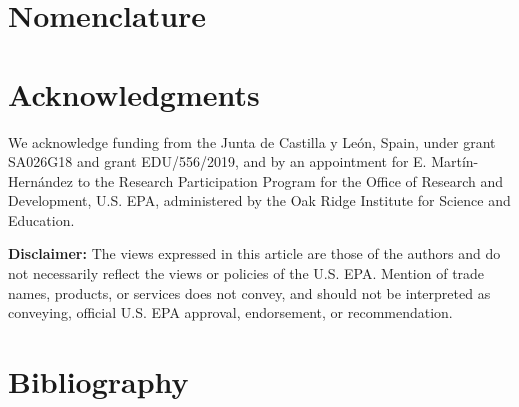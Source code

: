 \begin{refsection}[referencesCh3]

\section*{Nomenclature}

\vspace{-0.8cm}
\begingroup     
\let\clearpage\relax
%

%
\glsaddall
\setlength\LTleft{0pt}
\setlength\LTright{0pt}
\setlength\glsdescwidth{0.8\hsize}
\renewcommand*{\glossarypreamble}{\vspace{-0.8cm}}
\printglossary[type=VarCh3, style=long]
\vspace{10pt}
\printglossary[type=AcroCh3, style=long]
\endgroup


\section*{Acknowledgments} \label{section:Ch3Acknowledgments}
We acknowledge funding from the Junta de Castilla y Le\'{o}n, Spain, under grant SA026G18 and grant EDU/556/2019, and by an appointment for E. Mart\'{i}n-Hern\'{a}ndez to the Research Participation Program for the Office of Research and Development, U.S. EPA, administered by the Oak Ridge Institute for Science and Education. 

\textbf{Disclaimer:} The views expressed in this article are those of the authors and do not necessarily reflect the views or policies of the U.S. EPA. Mention of trade names, products, or services does not convey, and should not be interpreted as conveying, official U.S. EPA approval, endorsement, or recommendation.

\section*{Bibliography}

\printbibliography[heading=none]
\end{refsection}